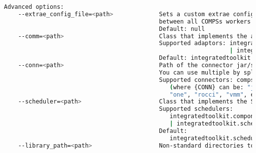 \begin{lstlisting}[language=bash]
  Advanced options:                                                                                                                                                                     
    --extrae_config_file=<path>             Sets a custom extrae config file. Must be in a shared disk
                                            between all COMPSs workers.                                                      
                                            Default: null                                                                                                                               
    --comm=<path>                           Class that implements the adaptor for communications                                                                                        
                                            Supported adaptors: integratedtoolkit.nio.master.NIOAdaptor 
                                                                | integratedtoolkit.gat.master.GATAdaptor                                       
                                            Default: integratedtoolkit.nio.master.NIOAdaptor                                                                                            
    --conn=<path>                           Path of the connector jar/s that should be loaded. 
                                            You can use multiple by splitting with ':'                                               
                                            Supported connectors: compss-{CONN}-connector.jar                                                                                           
                                               (where {CONN} can be: "jclouds", "amazon", "docker", 
                                               "one", "rocci", "vmm", etc.)                                                        
    --scheduler=<path>                      Class that implements the Scheduler for COMPSs                                                                                              
                                            Supported schedulers: 
                                               integratedtoolkit.components.impl.TaskScheduler 
                                               | integratedtoolkit.scheduler.readyscheduler.ReadyScheduler           
                                            Default: 
                                               integratedtoolkit.scheduler.readyscheduler.ReadyScheduler                                                                          
    --library_path=<path>                   Non-standard directories to search for libraries (e.g. Java 

\end{lstlisting}

